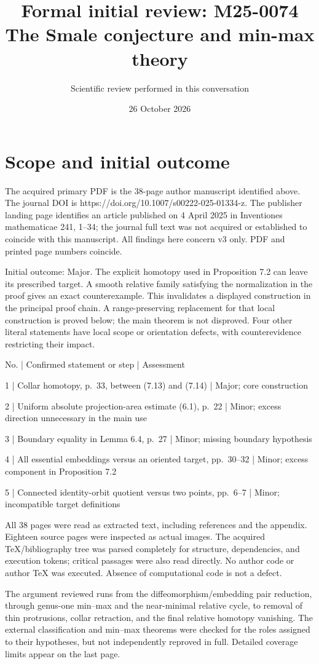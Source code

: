 \documentclass[10pt]{article}
\title{Formal initial review: M25-0074
The Smale conjecture and min-max theory}
\author{Scientific review performed in this conversation}
\date{26 October 2026}
\begin{document}
\maketitle
\section*{Scope and initial outcome}
The acquired primary PDF is the 38-page author manuscript identified above. The journal DOI is https://doi.org/10.1007/s00222-025-01334-z. The publisher landing page identifies an article published on 4 April 2025 in Inventiones mathematicae 241, 1–34; the journal full text was not acquired or established to coincide with this manuscript. All findings here concern v3 only. PDF and printed page numbers coincide.\par
Initial outcome: Major. The explicit homotopy used in Proposition 7.2 can leave its prescribed target. A smooth relative family satisfying the normalization in the proof gives an exact counterexample. This invalidates a displayed construction in the principal proof chain. A range-preserving replacement for that local construction is proved below; the main theorem is not disproved. Four other literal statements have local scope or orientation defects, with counterevidence restricting their impact.\par
No. | Confirmed statement or step | Assessment\par
1 | Collar homotopy, p. 33, between (7.13) and (7.14) | Major; core construction\par
2 | Uniform absolute projection-area estimate (6.1), p. 22 | Minor; excess direction unnecessary in the main use\par
3 | Boundary equality in Lemma 6.4, p. 27 | Minor; missing boundary hypothesis\par
4 | All essential embeddings versus an oriented target, pp. 30–32 | Minor; excess component in Proposition 7.2\par
5 | Connected identity-orbit quotient versus two points, pp. 6–7 | Minor; incompatible target definitions\par
All 38 pages were read as extracted text, including references and the appendix. Eighteen source pages were inspected as actual images. The acquired TeX/bibliography tree was parsed completely for structure, dependencies, and execution tokens; critical passages were also read directly. No author code or author TeX was executed. Absence of computational code is not a defect.\par
The argument reviewed runs from the diffeomorphism/embedding pair reduction, through genus-one min–max and the near-minimal relative cycle, to removal of thin protrusions, collar retraction, and the final relative homotopy vanishing. The external classification and min–max theorems were checked for the roles assigned to their hypotheses, but not independently reproved in full. Detailed coverage limits appear on the last page.\par
\end{document}
